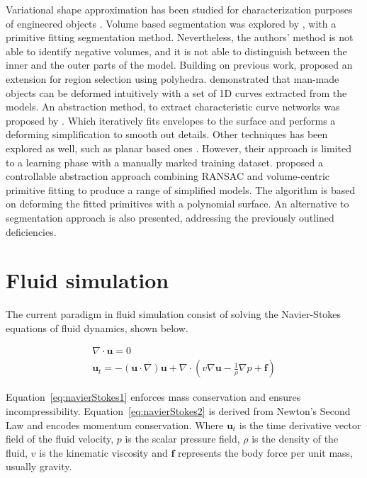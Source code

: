 Variational shape approximation has been studied for characterization purposes of engineered objects \cite{Cohen-Steiner2004}.
Volume based segmentation was explored by \cite{Attene2006}, with a primitive fitting segmentation method.
Nevertheless, the authors' method is not able to identify negative volumes, and it is not able to distinguish between the inner and the outer parts of the model.
Building on previous work, \cite{Attene2008} proposed an extension for region selection using polyhedra.
\cite{Gal2009} demonstrated that man-made objects can be deformed intuitively with a set of 1D curves extracted from the models.
An abstraction method, to extract characteristic curve networks was proposed by \cite{Mehra2009}.
Which iteratively fits envelopes to the surface and performs a deforming simplification to smooth out details.
Other techniques has been explored as well, such as planar based ones \cite{McCrae2011}.
However, their approach is limited to a learning phase with a manually marked training dataset.
\cite{Yumer2012} proposed a controllable abstraction approach combining RANSAC and volume-centric primitive fitting to produce a range of simplified models.
The algorithm is based on deforming the fitted primitives with a polynomial surface.
An alternative to \cite{Attene2006} segmentation approach is also presented, addressing the previously outlined deficiencies.

\section{Fluid simulation}
\label{prevWorkFluidSim}

The current paradigm in fluid simulation consist of solving the Navier-Stokes equations of fluid dynamics, shown below.

\begin{gather}
\label{eq:navierStokes1}
\nabla \cdot \mathbf{u} = 0\\
\label{eq:navierStokes2}
\mathbf{u}_t = -(\mathbf{u} \cdot \nabla)\mathbf{u} + \nabla \cdot ( v \nabla \mathbf{u} - \frac{1}{\rho} \nabla p + \mathbf{f} )
\end{gather}

Equation~\ref{eq:navierStokes1} enforces mass conservation and ensures incompressibility. Equation~\ref{eq:navierStokes2} is derived from Newton's Second Law and encodes momentum conservation.
Where $\mathbf{u}_t$ is the time derivative vector field of the fluid velocity, $p$  is the scalar pressure field, $\rho$ is the density of the fluid, $v$ is the kinematic viscosity and $\mathbf{f}$ represents the body force per unit mass, usually gravity.

